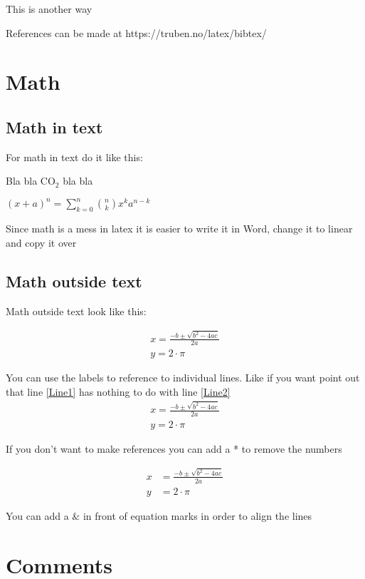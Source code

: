 This is another way \citep{isover}

References can be made at https://truben.no/latex/bibtex/ 



\section{Math}

\subsection{Math in text}
For math in text do it like this: 

Bla bla CO$_2$ bla bla

$\left(x+a\right)^n=\sum_{k=0}^{n}{\binom{n}{k}x^ka^{n-k}}$

Since math is a mess in latex it is easier to write it in Word, change it to  linear and copy it over


\subsection{Math outside text}

Math outside text look like this:

\begin{align}
    x = \frac{-b\pm\sqrt{b^2-4ac}}{2a}  \label{Line1}  \\
    y = 2\cdot \pi \label{Line2}
\end{align}

You can use the labels to reference to individual lines. Like if you want point out that line \ref{Line1} has nothing to do with line \ref{Line2}
\begin{align*}
    x = \frac{-b\pm\sqrt{b^2-4ac}}{2a} \\
    y = 2\cdot \pi
\end{align*}

If you don't want to make references you can add a * to remove the numbers

\begin{align}
    x &= \frac{-b\pm\sqrt{b^2-4ac}}{2a} \\
    y &= 2\cdot \pi
\end{align}

You can add a \& in front of equation marks in order to align the lines 

\section{Comments}

